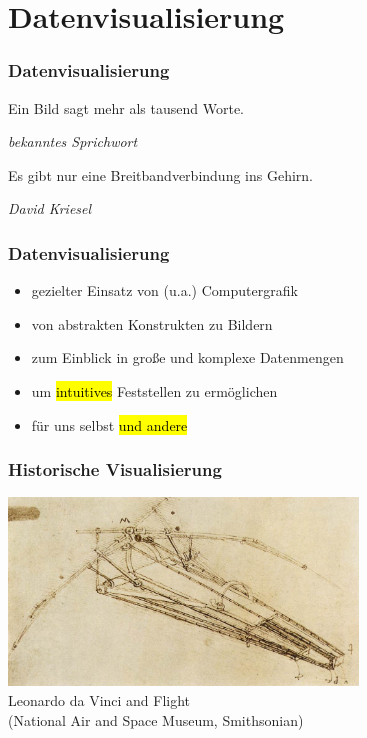 
\section{Datenvisualisierung}

\begin{frame}
\frametitle{Datenvisualisierung}

\vfill

\epigraph{Ein Bild sagt mehr als tausend Worte.}{\textit{bekanntes Sprichwort}}

\vfill

\epigraph{Es gibt nur eine Breitbandverbindung ins Gehirn.}{\textit{David Kriesel}}

\vfill
\end{frame}


\begin{frame}
\frametitle{Datenvisualisierung}

\begin{itemize}
	\item gezielter Einsatz von (u.a.) Computergrafik
	\item von abstrakten Konstrukten zu Bildern
	\item zum Einblick in große und komplexe Datenmengen
	\item um \hl{intuitives} Feststellen zu ermöglichen
	\item für uns selbst \hl{und andere}
\end{itemize}
\end{frame}


\begin{frame}
\frametitle{Historische Visualisierung}

\vfill
\begin{center}
	\includegraphics[height=50mm]{fig5/historical-davinci.jpg} \\
	\scriptsize Leonardo da Vinci and Flight \\
	\tiny (National Air and Space Museum, Smithsonian)
\end{center}
\vfill
\end{frame}


